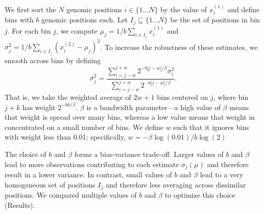\documentclass[11pt]{article}
\begin{document}
We first sort the $N$ genomic positions $i \in \{1\dots N\}$ by the value of $x^{(1)}_i$ and define bins with $b$ genomic positions each. 
Let $I_j \subseteq \{1\dots N\}$ be the set of positions in bin $j$. 
For each bin $j$, we compute $\mu_j = 1/b \sum_{i \in I_j} x^{(1)}_i$ and $\sigma_j^2 = 1/b \sum_{i \in I_j} (x^{(2)}_i - \mu_j)^2$.  
To increase the robustness of these estimates, we smooth across bins by defining 
\begin{equation}
\bar \sigma_j^2 = \frac {\sum_{i=j-w}^{j+w} 2^{-b |j-w|/\beta} \sigma_i^2} {\sum_{i=j-w}^{j+w} 2^{-b |j-w|/\beta}} .
\end{equation}
That is, we take the weighted average of $2w+1$ bins centered on $j$, where bin $j+k$ has weight $2^{- b k/\beta}$. $\beta$ is a bandwidth parameter---a high value of $\beta$ means that weight is spread over many bins, whereas a low value means that weight in concentrated on a small number of bins.  
We define $w$ such that it ignores bins with weight less than 0.01; specifically, $w = -\beta  \log(0.01) / b \log(2)$

The choice of $b$ and $\beta$ forms a bias-variance trade-off. 
Larger values of $b$ and $\beta$ lead to more observations contributing to each estimate $\sigma_j(\mu)$ and therefore result in a lower variance. 
In contrast, small values of $b$ and $\beta$ lead to a very homogeneous set of positions $I_j$ and therefore less averaging across dissimilar positions. 
We compared multiple values of $b$ and $\beta$ to optimize this choice (Results).
\end{document}
